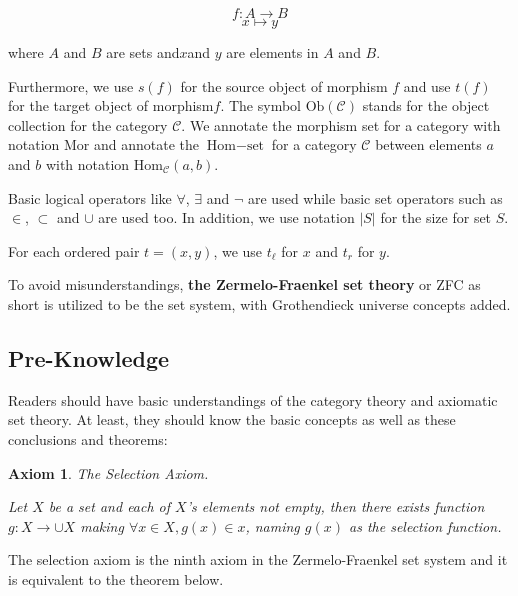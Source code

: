 \documentclass{article}
\newtheorem{axiom}{Axiom}
\begin{document}
\[f: A\to B\]
\[x\mapsto y\]

where \(A\) and \(B\) are sets and\(x\)and \(y\) are elements in \(A\) and \(B\).

 Furthermore, we use \(s(f)\) for the source object of morphism \(f\)\textit{  }and use \(t(f)\) for the target object of morphism\(f\). The symbol \(\text{Ob}(\mathcal{C})\) stands for the object collection for the category \(\mathcal{C}\). We annotate the morphism set for a category with notation \(\text{Mor}\) and annotate the \(\text{Hom}-\text{set}\) for a category \(\mathcal{C}\) between elements \(a\) and \(b\) with notation \(\text{Hom}_{\mathcal{C}}(a,b)\).

Basic logical operators like \(\forall\), \(\exists\) and \(\neg\) are used while basic set operators such as \(\in\), \(\subset\) and \(\cup\) are used too. In addition, we use notation \(|S|\) for the size for set \(S\).

For each ordered pair \(t=(x,y)\), we use \(t_{\ell }\) for \(x\) and \(t_{\mathit{r}}\) for \(y\).

To avoid misunderstandings, \textbf{the Zermelo-Fraenkel set theory} or ZFC as short is utilized to be the set system, with Grothendieck universe concepts added. \cite{1}

\subsection*{Pre-Knowledge}

Readers should have basic understandings of the category theory \cite{1} and axiomatic set theory. At least, they should know the basic concepts as well as these conclusions and theorems:

\begin{axiom}
	The Selection Axiom.
	
	Let \(X\) be a set and each of \(X\){'}s elements not empty, then there exists function \(g:X\to \cup X\) making \(\forall x\in X,g(x)\in x\), naming \(g(x)\) as the selection function.
\end{axiom}

The selection axiom is the ninth axiom in the Zermelo-Fraenkel set system and it is equivalent to the theorem below.
\end{document}
